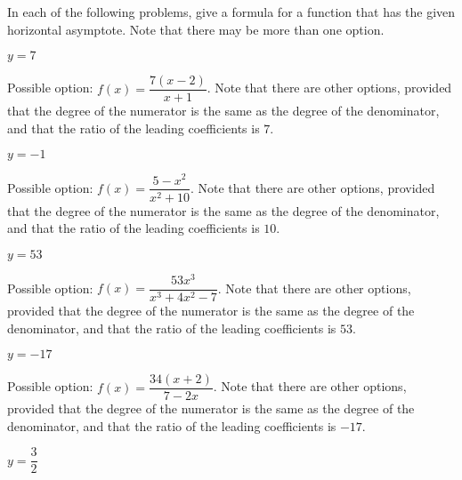 \begin{exercises}
 	\begin{problem}
 	In each of the following problems, give a formula for a function that
 	has the given horizontal asymptote. Note that there may be more than one option.
 	\begin{multicols}{4}
 		\begin{subproblem}
 			$y=7$
 			\begin{shortsolution}
 				Possible option: $f(x)=\dfrac{7(x-2)}{x+1}$. Note that there
 				are other options, provided that the degree of the numerator is the same as the degree
 				of the denominator, and that the ratio of the leading
 				coefficients is $7$.
 			\end{shortsolution}
 		\end{subproblem}
 		\begin{subproblem}
 			$y=-1$
 			\begin{shortsolution}
 				Possible option: $f(x)=\dfrac{5-x^2}{x^2+10}$. Note that there
 				are other options, provided that the degree of the numerator is the same as the degree
 				of the denominator, and that the ratio of the leading
 				coefficients is $10$.
 			\end{shortsolution}
 		\end{subproblem}
 		\begin{subproblem}
 			$y=53$
 			\begin{shortsolution}
 				Possible option: $f(x)=\dfrac{53x^3}{x^3+4x^2-7}$. Note that there
 				are other options, provided that the degree of the numerator is the same as the degree
 				of the denominator, and that the ratio of the leading
 				coefficients is $53$.
 			\end{shortsolution}
 		\end{subproblem}
 		\begin{subproblem}
 			$y=-17$
 			\begin{shortsolution}
 				Possible option: $f(x)=\dfrac{34(x+2)}{7-2x}$. Note that there
 				are other options, provided that the degree of the numerator is the same as the degree
 				of the denominator, and that the ratio of the leading
 				coefficients is $-17$.
 			\end{shortsolution}
 		\end{subproblem}
 		\begin{subproblem}
 			$y=\dfrac{3}{2}$
 			\begin{shortsolution}

\end{shortsolution}
\end{subproblem}
\end{multicols}
\end{problem}
\end{exercises}
